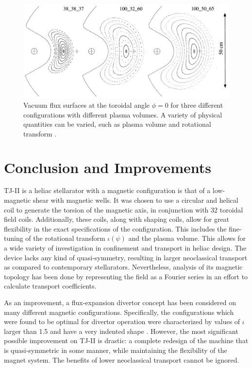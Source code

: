 \documentclass[a4paper]{article}
\begin{document}
\begin{figure}
\centering
	\includegraphics[width=\linewidth]{../Graphics/3_configs.png}
	\caption{Vacuum flux surfaces at the toroidal angle $\phi = 0$ for three different configurations with different plasma volumes. A variety of physical quantities can be varied, such as plasma volume and rotational transform \cite{alejaldre_first_1999}.}
	\label{fig:3_configs}
\end{figure}


\section*{Conclusion and Improvements}
TJ-II is a heliac stellarator with a magnetic configuration is that of a low-magnetic shear with magnetic wells.
It was chosen to use a circular and helical coil to generate the torsion of the magnetic axis, in conjunction with 32 toroidal field coils.
Additionally, these coils, along with shaping coils, allow for great flexibility in the exact specifications of the configuration.
This includes the fine-tuning of the rotational transform $\iota(\psi)$ and the plasma volume.
This allows for a wide variety of investigation in confinement and transport in heliac design.
The device lacks any kind of quasi-symmetry, resulting in larger neoclassical transport as compared to contemporary stellarators.
Nevertheless, analysis of its magnetic topology has been done by representing the field as a Fourier series in an effort to calculate transport coefficients.

As an improvement, a flux-expansion divertor concept has been considered on many different magnetic configurations.
Specifically, the configurations which were found to be optimal for divertor operation were characterized by values of $\iota$ larger than 1.5 and have a very indented shape \cite{castejon_flux-expansion_2009}.
However, the most significant possible improvement on TJ-II is drastic: a complete redesign of the machine that is quasi-symmetric in some manner, while maintaining the flexibility of the magnet system.
The benefits of lower neoclassical transport cannot be ignored.




\end{document}
